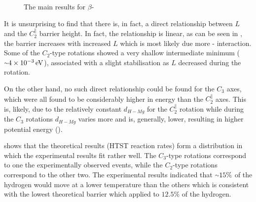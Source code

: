 \begin{figure}[htb]
\begin{center}
\caption{The main results for $\beta$- 
}
\label{fig:mg-results}
\end{center}
\end{figure}

It is unsurprising to find that there is, in fact, a direct relationship between $L$ and the $C_2^\parallel$ barrier height.
In fact, the relationship is linear, as can be seen in , the barrier increases with increased $L$ which is most likely due more - interaction.
Some of the $C_2$-type rotations showed a very shallow intermediate minimum ($\mytilde 4\times10^{-3} \unit{eV}$), associated with a slight stabilisation as $L$ decreased during the rotation.

On the other hand, no such direct relationship could be found for the $C_3$ axes, which were all found to be considerably higher in energy than the $C_2^\parallel$ axes.
This is, likely, due to the relatively constant $d_{H-Mg}$ for the $C_2^\parallel$ rotation while during the $C_3$ rotations $d_{H-Mg}$ varies more and is, generally, lower, resulting in higher potential energy ().

 shows that the theoretical results (HTST reaction rates) form a distribution in which the experimental results fit rather well.
The $C_3$-type rotations correspond to one the experimentally observed events, while the $C_2$-type rotations correspond to the other two.
The experimental results indicated that $\mytilde 15\%$ of the hydrogen would move at a lower temperature than the others which is consistent with the lowest theoretical barrier which applied to $12.5\%$ of the hydrogen.

